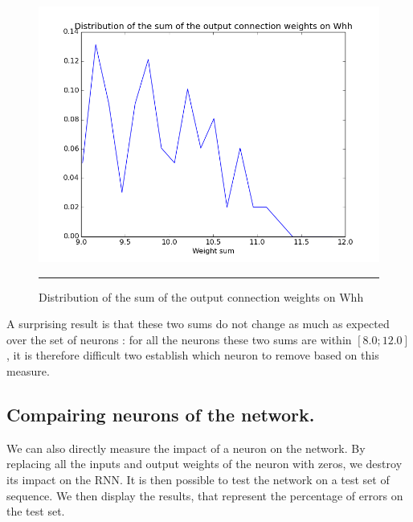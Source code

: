 \begin{figure}[htbp]
    \centering
    \includegraphics[scale=0.4]{Figures/output_sum_weight_distribution.png}
    \rule{35em}{0.5pt}
    \caption[Distribution of the sum of the output connection weights on Whh]{Distribution of the sum of the output connection weights on Whh}
    \label{fig:output_sum}
\end{figure}

A surprising result is that these two sums do not change as much as expected over the set of neurons : for all the neurons these two sums are within $[8.0; 12.0]$, it is therefore difficult two establish which neuron to remove based on this measure.

\subsection{Compairing neurons of the network.}

We can also directly measure the impact of a neuron on the network. By replacing all the inputs and output weights of the neuron with zeros, we destroy its impact on the RNN. It is then possible to test the network on a test set of sequence. We then display the results, that represent the percentage of errors on the test set. 

